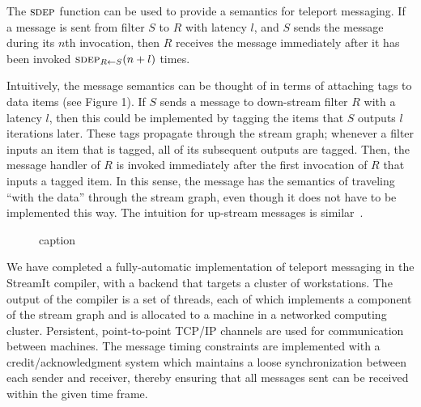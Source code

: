 \documentclass{csailabstractbook}
\begin{document}
The $\textsc{sdep}$ function can be used to provide a semantics for
teleport messaging.  If a message is sent from filter $S$ to $R$ with
latency $l$, and $S$ sends the message during its $n$th invocation,
then $R$ receives the message immediately after it has been invoked
$\textsc{sdep}_{R \small{\leftarrow} S}(n+l)$ times.

Intuitively, the message semantics can be thought of in terms of
attaching tags to data items (see Figure 1). If $S$ sends a message to
down-stream filter $R$ with a latency $l$, then this could be
implemented by tagging the items that $S$ outputs $l$ iterations
later. These tags propagate through the stream graph; whenever a
filter inputs an item that is tagged, all of its subsequent outputs
are tagged.  Then, the message handler of $R$ is invoked immediately
after the first invocation of $R$ that inputs a tagged item. In this
sense, the message has the semantics of traveling ``with the data''
through the stream graph, even though it does not have to be
implemented this way.  The intuition for up-stream messages is
similar~\cite{sdep04}.


\begin{figure}[t]
  \vspace{-12pt}
  \begin{center}
    \vspace{0.9in}
  \end{center}
  \vspace{-6pt}
  \caption{caption}
\vspace{-12pt}
\end{figure}


We have completed a fully-automatic implementation of teleport
messaging in the StreamIt compiler, with a backend that targets a
cluster of workstations.  The output of the compiler is a set of
threads, each of which implements a component of the stream graph and
is allocated to a machine in a networked computing cluster.
Persistent, point-to-point TCP/IP channels are used for communication
between machines.  The message timing constraints are implemented with
a credit/acknowledgment system which maintains a loose
synchronization between each sender and receiver, thereby ensuring
that all messages sent can be received within the given time frame.
\end{document}
